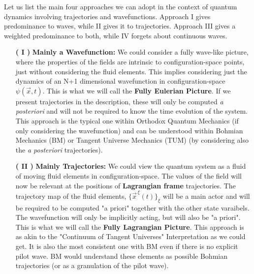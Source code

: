 \documentclass[11pt, a4paper]{article} %
\begin{document}
Let us list the main four approaches we can adopt in the context of quantum dynamics involving trajectories and wavefunctions. Approach I gives predominance to waves, while II gives it to trajectories. Approach III gives a weighted predominance to both, while IV forgets about continuous waves.
\vspace{-0.1cm}
\begin{enumerate}
\item[\bf ( I )] {\bf Mainly a Wavefunction: } We could consider a fully wave-like picture, where the properties of the fields are intrinsic to configuration-space points, just without considering the fluid elements. This implies considering just the dynamics of an N+1 dimensional wavefunction in configuration-space $\psi(\vec{x},t)$. This is what we will call the {\bf Fully Eulerian Picture}. If we present trajectories in the description, these will only be computed {\em a posteriori} and will not be required to know the time evolution of the system. This approach is the typical one within Orthodox Quantum Mechanics (if only considering the wavefunction) and can be understood within Bohmian Mechanics (BM) or Tangent Universe Mechanics (TUM) (by considering also the {\em a posteriori} trajectories).


\item[\bf ( II )]{\bf Mainly Trajectories:} We could view the quantum system as a fluid of moving fluid elements in configuration-space. The values of the field will now be relevant at the positions of {\bf Lagrangian frame} trajectories. The trajectory map of the fluid elements, $\{\vec{x}^{\, \xi}(t)\}_\xi$ will be a main actor and will be required to be computed "a priori" together with the other state varaibels. The wavefunction will only be implicitly acting, but will also be "a priori". This is what we will call the {\bf Fully Lagrangian Picture}. This approach is as akin to the "Continuum of Tangent Universes" Interpretation as we could get. It is also the most consistent one with BM even if there is no explicit pilot wave. BM would understand these elements as possible Bohmian trajectories (or as a granulation of the pilot wave).


\end{enumerate}
\end{document}
